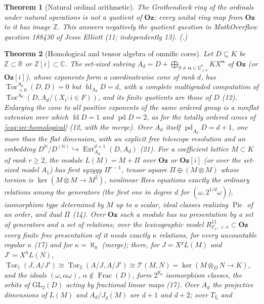 \documentclass[11pt,letterpaper]{article}
\numberwithin{equation}{section}
\theoremstyle{definition}
\theoremstyle{remark}
\theoremstyle{plain}
\newtheorem{maintheorem}{Theorem}
\newcommand{\Oz}{\mathbf{Oz}}
\newcommand{\GOz}{\Oz[i]}
\newcommand{\Z}{\mathbb Z}
\newcommand{\Q}{\mathbb Q}
\newcommand{\R}{\mathbb R}
\newcommand{\C}{\mathbb C}
\newcommand{\N}{\mathbb N}
\newcommand{\Frac}{\operatorname{Frac}}
\newcommand{\Tor}{\operatorname{Tor}}
\newcommand{\Ext}{\operatorname{Ext}}
\newcommand{\pd}{\operatorname{pd}}
\newcommand{\fd}{\operatorname{fd}}
\begin{document}
\begin{maintheorem}[Natural ordinal arithmetic]\label{osq:main:ordinal}
The Grothendieck ring of the ordinals under natural operations is not a quotient of $\Oz$; every
unital ring map from $\Oz$ to it has image $\Z$. This answers negatively the quotient question in
MathOverflow question 188430 of Jesse Elliott (11; independently 13). (.)
\end{maintheorem}

\begin{maintheorem}[Homological and tensor algebra of omnific cores]\label{osq:hd:main:cores}
Let $D\subseteq K$ be $\Z\subset\R$ or $\Z[i]\subset\C$. The set-sized subring
$A_d=D+\bigoplus_{0\ne\boldsymbol\alpha\in\Q_{\ge0}^d}KX^{\boldsymbol\alpha}$ of $\Oz$ (or $\GOz$), whose exponents form a
coordinatewise cone of rank $d$, has $\Tor^{A_d}_{>0}(D,D)=0$ but $\fd_{A_d}D=d$, with a complete multigraded
computation of $\Tor^{A_d}(D,A_d/(X_i:i\in F))$, and its finite quotients are those of $D$ (12). Enlarging the cone to
all positive exponents of the same ordered group is a nonflat extension over which $\fd D=1$ and $\pd D=2$, as for the
totally ordered cones of \cref{osq:sec:homological} (12, with the merge). Over $A_d$ itself $\pd_{A_d}D=d+1$, one more than the
flat dimension, with an explicit free telescope resolution and an embedding $D^{\N}/D^{(\N)}\hookrightarrow\Ext^{d+1}_{A_d}(D,A_d)$ (21).
For a coefficient lattice $M\subset K$ of rank
$r\ge2$, the module $L(M)=M+\Pi$ over $\Oz$ or $\GOz$ (or over the set-sized model $A_1$) has first syzygy $\Pi^{r-1}$,
tensor square $\Pi\oplus(M\otimes M)$ whose torsion is $\ker(M\otimes M\to M^2)$, nonlinear Rees equations exactly the
ordinary relations among the generators (the first one in degree $d$ for $(\omega,2^{1/d}\omega)$), isomorphism type
determined by $M$ up to a scalar, ideal classes realizing $\operatorname{Pic}$ of an order, and dual $\Pi$ (14).
Over $\Oz$ such a module has no presentation by a set of generators and a set of relations; over the
lexicographic model $R^{11}_{\Gamma_\kappa,<\kappa}\subset\Oz$ every finite free presentation of it needs exactly
$\kappa$ relations, for every uncountable regular $\kappa$ (17) and for $\kappa=\aleph_0$ (merge); there, for
$J=X^gL(M)$ and $J'=X^hL(N)$, $\Tor_1(J,A/J')\cong\Tor_2(A/J,A/J')\cong\mathcal T(M,N)=\ker(M\otimes_DN\to K)$,
and the ideals $(\omega,\alpha\omega)$,
$\alpha\notin\Frac(D)$, form $2^{\aleph_0}$ isomorphism classes, the orbits of $\mathrm{GL}_2(D)$ acting by
fractional linear maps (17). Over $A_d$ the projective dimensions of $L(M)$ and $A_d/J_g(M)$ are $d+1$ and $d+2$; over $T_\Q$ and

\end{maintheorem}
\end{document}
